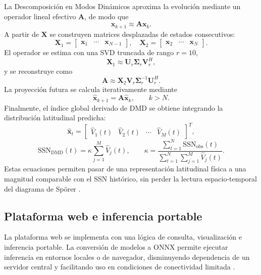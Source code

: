 La Descomposición en Modos Dinámicos aproxima la evolución mediante un operador lineal efectivo $\mathbf{A}$, de modo que
\begin{equation}
\mathbf{x}_{k+1}\approx\mathbf{A}\mathbf{x}_{k}.
\end{equation}
A partir de $\mathbf{X}$ se construyen matrices desplazadas de estados consecutivos:
\begin{equation}
\mathbf{X}_1=\begin{bmatrix}\mathbf{x}_1&\cdots&\mathbf{x}_{N-1}\end{bmatrix},\quad
\mathbf{X}_2=\begin{bmatrix}\mathbf{x}_2&\cdots&\mathbf{x}_{N}\end{bmatrix}.
\end{equation}
El operador se estima con una SVD truncada de rango $r=10$,
\begin{equation}
\mathbf{X}_1\approx\mathbf{U}_r\boldsymbol{\Sigma}_r\mathbf{V}_r^{H},
\end{equation}
y se reconstruye como
\begin{equation}
\mathbf{A}\approx\mathbf{X}_2\mathbf{V}_r\boldsymbol{\Sigma}_r^{-1}\mathbf{U}_r^{H}.
\end{equation}
La proyección futura se calcula iterativamente mediante
\begin{equation}
\widehat{\mathbf{x}}_{k+1}=\mathbf{A}\widehat{\mathbf{x}}_k, \qquad k>N.
\end{equation}
Finalmente, el índice global derivado de DMD se obtiene integrando la distribución latitudinal predicha:
\begin{equation}
\widehat{\mathbf{x}}_t=\begin{bmatrix}\widehat{V}_1(t)&\widehat{V}_2(t)&\cdots&\widehat{V}_M(t)\end{bmatrix}^{T},
\end{equation}
\begin{equation}
\mathrm{SSN}_{\mathrm{DMD}}(t)=\kappa\sum_{j=1}^{M}\widehat{V}_j(t), \qquad
\kappa=\frac{\sum_{t=1}^{N}\mathrm{SSN}_{\mathrm{obs}}(t)}{\sum_{t=1}^{N}\sum_{j=1}^{M}\widehat{V}_j(t)}.
\end{equation}
Estas ecuaciones permiten pasar de una representación latitudinal física a una magnitud comparable con el SSN histórico, sin perder la lectura espacio-temporal del diagrama de Spörer \citep{schmid2010dmd,kutz2016dmd,hathaway2015solarcycle}.

\subsection{Plataforma web e inferencia portable}

La plataforma web se implementa con una lógica de consulta, visualización e inferencia portable. La conversión de modelos a ONNX permite ejecutar inferencia en entornos locales o de navegador, disminuyendo dependencia de un servidor central y facilitando uso en condiciones de conectividad limitada \citep{woo2023convnextv2,ultralyticsYOLO26,camporeale2019ml}.